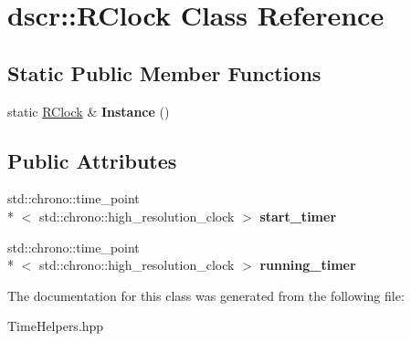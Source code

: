 \hypertarget{classdscr_1_1_r_clock}{\section{dscr\-:\-:R\-Clock Class Reference}
\label{classdscr_1_1_r_clock}
}
\subsection*{Static Public Member Functions}
\begin{DoxyCompactItemize}
\item 
\hypertarget{classdscr_1_1_r_clock_a10bfd78f1ec37b2d1fc1d79fac81ea1b}{static \hyperlink{classdscr_1_1_r_clock}{R\-Clock} \& {\bfseries Instance} ()}\label{classdscr_1_1_r_clock_a10bfd78f1ec37b2d1fc1d79fac81ea1b}

\end{DoxyCompactItemize}
\subsection*{Public Attributes}
\begin{DoxyCompactItemize}
\item 
\hypertarget{classdscr_1_1_r_clock_aedf7313152181172e967d8a927f5e92e}{std\-::chrono\-::time\-\_\-point\\*
$<$ std\-::chrono\-::high\-\_\-resolution\-\_\-clock $>$ {\bfseries start\-\_\-timer}}\label{classdscr_1_1_r_clock_aedf7313152181172e967d8a927f5e92e}

\item 
\hypertarget{classdscr_1_1_r_clock_aa0ef70fb9ab23841cbc12058f9325454}{std\-::chrono\-::time\-\_\-point\\*
$<$ std\-::chrono\-::high\-\_\-resolution\-\_\-clock $>$ {\bfseries running\-\_\-timer}}\label{classdscr_1_1_r_clock_aa0ef70fb9ab23841cbc12058f9325454}

\end{DoxyCompactItemize}


The documentation for this class was generated from the following file\-:\begin{DoxyCompactItemize}
\item 
Time\-Helpers.\-hpp\end{DoxyCompactItemize}
